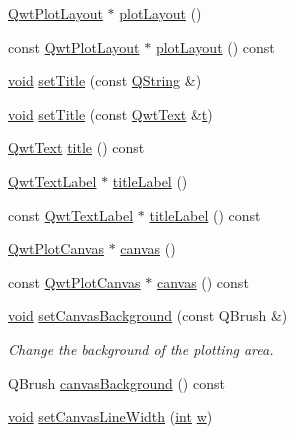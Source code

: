 \begin{DoxyCompactItemize}
\hyperlink{class_qwt_plot_layout}{Qwt\-Plot\-Layout} $\ast$ \hyperlink{class_qwt_plot_a9156b14a6f67f6279a16fea063ce1d14}{plot\-Layout} ()
\item 
const \hyperlink{class_qwt_plot_layout}{Qwt\-Plot\-Layout} $\ast$ \hyperlink{class_qwt_plot_a6abb53bb19d8e931ba49bf439779f0ac}{plot\-Layout} () const 
\item 
\hyperlink{group___u_a_v_objects_plugin_ga444cf2ff3f0ecbe028adce838d373f5c}{void} \hyperlink{class_qwt_plot_a9a7f0b219b404e5bed5dfca26c5c06a7}{set\-Title} (const \hyperlink{group___u_a_v_objects_plugin_gab9d252f49c333c94a72f97ce3105a32d}{Q\-String} \&)
\item 
\hyperlink{group___u_a_v_objects_plugin_ga444cf2ff3f0ecbe028adce838d373f5c}{void} \hyperlink{class_qwt_plot_a032ced8ddfad7483a372214954203719}{set\-Title} (const \hyperlink{class_qwt_text}{Qwt\-Text} \&\hyperlink{glext_8h_a00140d6f5c548b26daf170bf16e86a6d}{t})
\item 
\hyperlink{class_qwt_text}{Qwt\-Text} \hyperlink{class_qwt_plot_a1ae4b2e10f6691b7f1a14af70f743e2c}{title} () const 
\item 
\hyperlink{class_qwt_text_label}{Qwt\-Text\-Label} $\ast$ \hyperlink{class_qwt_plot_ac39356b86ed70ebf256a8ae964910206}{title\-Label} ()
\item 
const \hyperlink{class_qwt_text_label}{Qwt\-Text\-Label} $\ast$ \hyperlink{class_qwt_plot_abea1bb53b3f08fb085a1d954eb199078}{title\-Label} () const 
\item 
\hyperlink{class_qwt_plot_canvas}{Qwt\-Plot\-Canvas} $\ast$ \hyperlink{class_qwt_plot_aafcc82150034fbeb393ceb9f54ba2f1a}{canvas} ()
\item 
const \hyperlink{class_qwt_plot_canvas}{Qwt\-Plot\-Canvas} $\ast$ \hyperlink{class_qwt_plot_a31bea08461f58028fec6c2882f9a125c}{canvas} () const 
\item 
\hyperlink{group___u_a_v_objects_plugin_ga444cf2ff3f0ecbe028adce838d373f5c}{void} \hyperlink{class_qwt_plot_adb0b2e68d86039f86e3240fb399fa0fe}{set\-Canvas\-Background} (const Q\-Brush \&)
\begin{DoxyCompactList}\small\item\em Change the background of the plotting area. \end{DoxyCompactList}\item 
Q\-Brush \hyperlink{class_qwt_plot_a8e2efd0e10ae3b72773b5ab78f67375c}{canvas\-Background} () const 
\item 
\hyperlink{group___u_a_v_objects_plugin_ga444cf2ff3f0ecbe028adce838d373f5c}{void} \hyperlink{class_qwt_plot_a5af96e90be286753d524bdb042917618}{set\-Canvas\-Line\-Width} (\hyperlink{ioapi_8h_a787fa3cf048117ba7123753c1e74fcd6}{int} \hyperlink{glext_8h_ac1795f3b2fee217274b85c2750e1a889}{w})

\end{DoxyCompactItemize}
